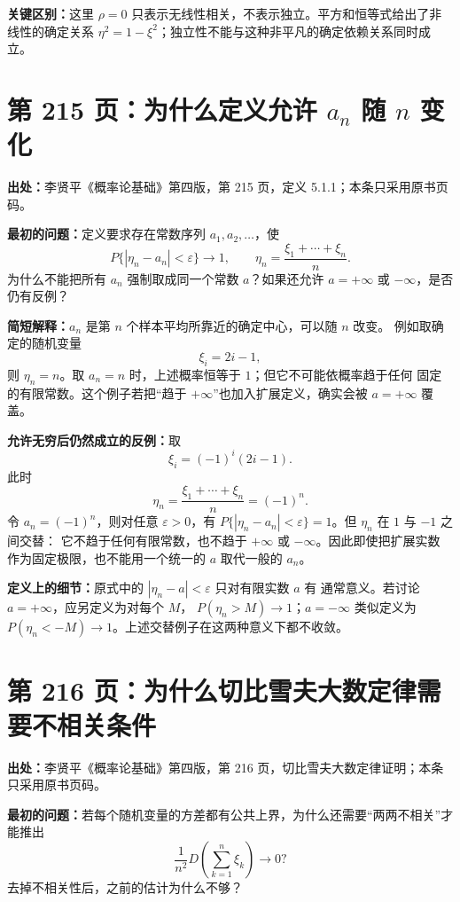 \documentclass[UTF8,a4paper,11pt]{ctexart}
\begin{document}
\textbf{关键区别：}这里 $\rho=0$ 只表示无线性相关，不表示独立。平方和恒等式给出了非线性的确定关系
$\eta^2=1-\xi^2$；独立性不能与这种非平凡的确定依赖关系同时成立。

\newpage
\section{第 215 页：为什么定义允许 $a_n$ 随 $n$ 变化}
\label{note:probability-p215-varying-centers}
\textbf{出处：}李贤平《概率论基础》第四版，第 215 页，定义 5.1.1；本条只采用原书页码。

\textbf{最初的问题：}定义要求存在常数序列 $a_1,a_2,\ldots$，使
\[
P\{|\eta_n-a_n|<\varepsilon\}\longrightarrow1,
\qquad
\eta_n=\frac{\xi_1+\cdots+\xi_n}{n}.
\]
为什么不能把所有 $a_n$ 强制取成同一个常数 $a$？如果还允许 $a=+\infty$ 或
$-\infty$，是否仍有反例？

\textbf{简短解释：}$a_n$ 是第 $n$ 个样本平均所靠近的确定中心，可以随 $n$ 改变。
例如取确定的随机变量
\[
\xi_i=2i-1,
\]
则 $\eta_n=n$。取 $a_n=n$ 时，上述概率恒等于 $1$；但它不可能依概率趋于任何
固定的有限常数。这个例子若把“趋于 $+\infty$”也加入扩展定义，确实会被
$a=+\infty$ 覆盖。

\textbf{允许无穷后仍然成立的反例：}取
\[
\xi_i=(-1)^i(2i-1).
\]
此时
\[
\eta_n=\frac{\xi_1+\cdots+\xi_n}{n}=(-1)^n.
\]
令 $a_n=(-1)^n$，则对任意 $\varepsilon>0$，有
$P\{|\eta_n-a_n|<\varepsilon\}=1$。但 $\eta_n$ 在 $1$ 与 $-1$ 之间交替：
它不趋于任何有限常数，也不趋于 $+\infty$ 或 $-\infty$。因此即使把扩展实数
作为固定极限，也不能用一个统一的 $a$ 取代一般的 $a_n$。

\textbf{定义上的细节：}原式中的 $|\eta_n-a|<\varepsilon$ 只对有限实数 $a$ 有
通常意义。若讨论 $a=+\infty$，应另定义为对每个 $M$，
$P(\eta_n>M)\to1$；$a=-\infty$ 类似定义为
$P(\eta_n<-M)\to1$。上述交替例子在这两种意义下都不收敛。

\newpage
\section{第 216 页：为什么切比雪夫大数定律需要不相关条件}
\label{note:probability-p216-chebyshev-variance-condition}
\textbf{出处：}李贤平《概率论基础》第四版，第 216 页，切比雪夫大数定律证明；本条只采用原书页码。

\textbf{最初的问题：}若每个随机变量的方差都有公共上界，为什么还需要“两两不相关”才能推出
\[
\frac{1}{n^2}D\left(\sum_{k=1}^n \xi_k\right)\longrightarrow0?
\]
去掉不相关性后，之前的估计为什么不够？
\end{document}
